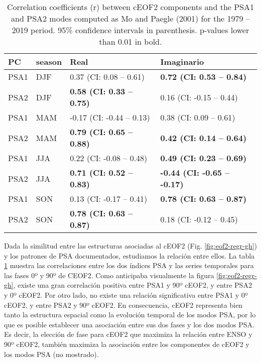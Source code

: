 \documentclass[12pt,oneside]{reedthesis}
\begin{document}
\begin{table}

\caption{\label{tab:psa-eof2}Correlation coefficients (r) between cEOF2 components and the PSA1 and PSA2 modes computed as Mo and Paegle (2001) for the 1979 -- 2019 period. 95\% confidence intervals in parenthesis. p-values lower than 0.01 in bold.}
\centering
\begin{tabular}[t]{ll>{}l>{}l}
\toprule
PC & season & Real & Imaginario\\
\midrule
PSA1 & DJF & 0.37 (CI: 0.08 -- 0.61) & \textbf{0.72 (CI: 0.53 -- 0.84)}\\
PSA2 & DJF & \textbf{0.58 (CI: 0.33 -- 0.75)} & 0.16 (CI: -0.15 -- 0.44)\\
PSA1 & MAM & -0.17 (CI: -0.44 -- 0.13) & 0.38 (CI: 0.09 -- 0.61)\\
PSA2 & MAM & \textbf{0.79 (CI: 0.65 -- 0.88)} & \textbf{0.42 (CI: 0.14 -- 0.64)}\\
PSA1 & JJA & 0.22 (CI: -0.08 -- 0.48) & \textbf{0.49 (CI: 0.23 -- 0.69)}\\
\addlinespace
PSA2 & JJA & \textbf{0.71 (CI: 0.52 -- 0.83)} & \textbf{-0.44 (CI: -0.65 -- -0.17)}\\
PSA1 & SON & 0.13 (CI: -0.17 -- 0.41) & \textbf{0.78 (CI: 0.63 -- 0.87)}\\
PSA2 & SON & \textbf{0.78 (CI: 0.63 -- 0.87)} & 0.18 (CI: -0.12 -- 0.45)\\
\bottomrule
\end{tabular}
\end{table}
Dada la similitud entre las estructuras asociadas al cEOF2 (Fig. \ref{fig:eof2-regr-gh}) y los patrones de PSA documentados, estudiamos la relación entre ellos.
La tabla \ref{tab:psa-eof2} muestra las correlaciones entre los dos índices PSA y las series temporales para las fases 0º y 90º de CEOF2.
Como anticipaba visualmente la figura \ref{fig:eof2-regr-gh}, existe una gran correlación positiva entre PSA1 y 90º cEOF2, y entre PSA2 y 0º cEOF2.
Por otro lado, no existe una relación significativa entre PSA1 y 0º cEOF2, y entre PSA2 y 90º cEOF2.
En consecuencia, cEOF2 representa bien tanto la estructura espacial como la evolución temporal de los modos PSA, por lo que es posible establecer una asociación entre sus dos fases y los dos modos PSA.
Es decir, la elección de fase para cEOF2 que maximiza la relación entre ENSO y 90º cEOF2, también maximiza la asociación entre los componentes de cEOF2 y los modos PSA (no mostrado).
\end{document}
